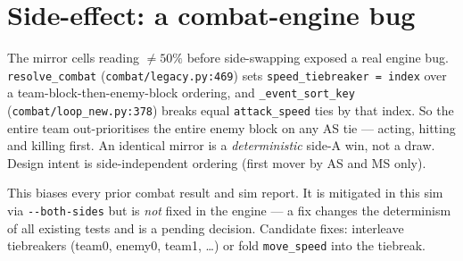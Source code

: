 \documentclass[11pt]{article}
\begin{document}
\section{Side-effect: a combat-engine bug}\label{sec:bug}

The mirror cells reading $\neq 50\%$ before side-swapping exposed a real engine bug.
\texttt{resolve\_combat} (\texttt{combat/legacy.py:469}) sets
\texttt{speed\_tiebreaker = index} over a team-block-then-enemy-block ordering, and
\texttt{\_event\_sort\_key} (\texttt{combat/loop\_new.py:378}) breaks equal
\texttt{attack\_speed} ties by that index. So the entire team out-prioritises the
entire enemy block on any AS tie --- acting, hitting and killing first. An identical
mirror is a \emph{deterministic} side-A win, not a draw. Design intent is
side-independent ordering (first mover by AS and MS only).

This biases every prior combat result and sim report. It is mitigated in this sim
via \texttt{-{}-both-sides} but is \emph{not} fixed in the engine --- a fix changes
the determinism of all existing tests and is a pending decision. Candidate fixes:
interleave tiebreakers (team0, enemy0, team1, \dots) or fold \texttt{move\_speed}
into the tiebreak.
\end{document}
